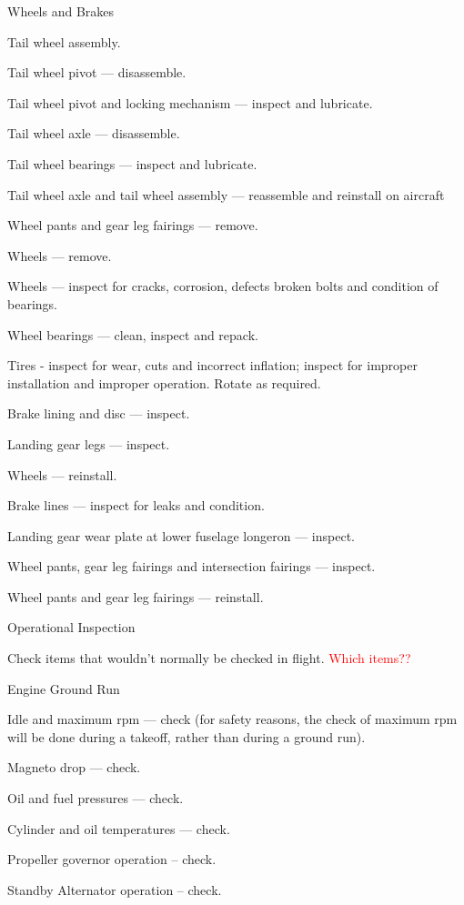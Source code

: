 \begin{enumerate*}
\begin{enumerate*}
	\end{enumerate*}
	\item{Wheels and Brakes} 
	\begin{enumerate*}
		\item Tail wheel assembly. 
		\begin{enumerate*}
		  \item Tail wheel pivot --- disassemble.
		  \item Tail wheel pivot and locking mechanism --- inspect and lubricate.
		  \item Tail wheel axle --- disassemble.
		  \item Tail wheel bearings --- inspect and lubricate.
		  \item Tail wheel axle and tail wheel assembly --- reassemble and reinstall on aircraft
	  \end{enumerate*}
		\item Wheel pants and gear leg fairings --- remove. 
		\item Wheels --- remove.
		\item Wheels --- inspect for cracks, corrosion, defects broken bolts and condition of bearings.
		\item Wheel bearings --- clean, inspect and repack.
		\item Tires - inspect for wear, cuts and incorrect inflation; inspect for improper installation and improper operation.  Rotate as required.
		\item Brake lining and disc --- inspect.
		\item Landing gear legs --- inspect.
		\item Wheels --- reinstall. 
		\item Brake lines --- inspect for leaks and condition.
		\item Landing gear wear plate at lower fuselage longeron --- inspect.
		\item Wheel pants, gear leg fairings and intersection fairings ---  inspect.
		\item Wheel pants and gear leg fairings --- reinstall. 
	\end{enumerate*}
	\item{Operational Inspection} 
	\begin{enumerate*}
		\item Check items that wouldn't normally be checked in flight. \textcolor{red}{Which items??} 
	\end{enumerate*}
	\item{Engine Ground Run}
	\begin{enumerate*}
		\item Idle and maximum rpm --- check (for safety reasons, the check of maximum rpm will be done during a takeoff, rather than during a ground run).
		\item Magneto drop --- check.
		\item Oil and fuel pressures --- check.
		\item Cylinder and oil temperatures --- check.
		\item Propeller governor operation -- check.
		\item Standby Alternator operation -- check.
	\end{enumerate*}


\end{enumerate*}
